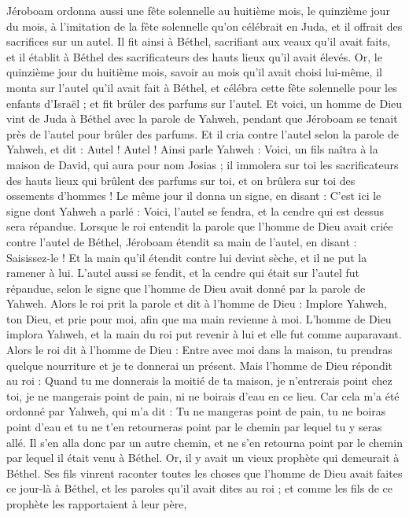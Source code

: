 \begin{multicols}{2}
Jéroboam ordonna aussi une fête solennelle au huitième mois, le quinzième jour du mois, à l'imitation de la fête solennelle qu'on célébrait en Juda, et il offrait des sacrifices sur un autel. Il fit ainsi à Béthel, sacrifiant aux veaux qu'il avait faits, et il établit à Béthel des sacrificateurs des hauts lieux qu'il avait élevés.
Or, le quinzième jour du huitième mois, savoir au mois qu'il avait choisi lui-même, il monta sur l'autel qu'il avait fait à Béthel, et célébra cette fête solennelle pour les enfants d'Israël ; et fit brûler des parfums sur l'autel.
\VerseOne{}Et voici, un homme de Dieu vint de Juda à Béthel avec la parole de Yahweh, pendant que Jéroboam se tenait près de l'autel pour brûler des parfums.
Et il cria contre l'autel selon la parole de Yahweh, et dit : Autel ! Autel ! Ainsi parle Yahweh : Voici, un fils naîtra à la maison de David, qui aura pour nom Josias ; il immolera sur toi les sacrificateurs des hauts lieux qui brûlent des parfums sur toi, et on brûlera sur toi des ossements d’hommes !
Le même jour il donna un signe, en disant : C'est ici le signe dont Yahweh a parlé : Voici, l'autel se fendra, et la cendre qui est dessus sera répandue.
Lorsque le roi entendit la parole que l'homme de Dieu avait criée contre l'autel de Béthel, Jéroboam étendit sa main de l'autel, en disant : Saisissez-le ! Et la main qu'il étendit contre lui devint sèche, et il ne put la ramener à lui.
L'autel aussi se fendit, et la cendre qui était sur l'autel fut répandue, selon le signe que l'homme de Dieu avait donné par la parole de Yahweh.
Alors le roi prit la parole et dit à l'homme de Dieu : Implore Yahweh, ton Dieu, et prie pour moi, afin que ma main revienne à moi. L'homme de Dieu implora Yahweh, et la main du roi put revenir à lui et elle fut comme auparavant.
Alors le roi dit à l'homme de Dieu : Entre avec moi dans la maison, tu prendras quelque nourriture et je te donnerai un présent.
Mais l'homme de Dieu répondit au roi : Quand tu me donnerais la moitié de ta maison, je n'entrerais point chez toi, je ne mangerais point de pain, ni ne boirais d'eau en ce lieu.
Car cela m'a été ordonné par Yahweh, qui m'a dit : Tu ne mangeras point de pain, tu ne boiras point d'eau et tu ne t'en retourneras point par le chemin par lequel tu y seras allé.
Il s'en alla donc par un autre chemin, et ne s'en retourna point par le chemin par lequel il était venu à Béthel.
Or, il y avait un vieux prophète qui demeurait à Béthel. Ses fils vinrent raconter toutes les choses que l'homme de Dieu avait faites ce jour-là à Béthel, et les paroles qu'il avait dites au roi ; et comme les fils de ce prophète les rapportaient à leur père,

\end{multicols}
